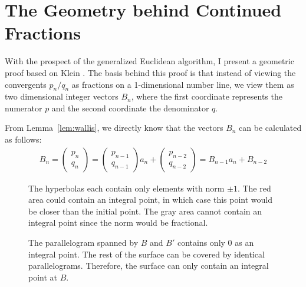\section{The Geometry behind Continued Fractions}

With the prospect of the generalized Euclidean algorithm, I present a geometric
proof based on Klein \cite{Klein95}.
The basis behind this proof is that instead of viewing the convergents $p_n/q_n$ as
fractions on a 1-dimensional number line,
we view them as two dimensional integer vectors $B_n$, where the first coordinate
represents the numerator $p$ and the second coordinate the denominator $q$.

From Lemma~\ref{lem:wallis},
we directly know that the vectors $B_n$ can be calculated as follows:
\begin{align*}
  B_n =
  \begin{pmatrix}
    p_n \\ q_n
  \end{pmatrix}
  =
  \begin{pmatrix}
    p_{n-1} \\ q_{n-1}
  \end{pmatrix}
  a_n
  +
  \begin{pmatrix}
    p_{n-2} \\ q_{n-2}
  \end{pmatrix}
  = B_{n-1} a_n + B_{n-2}
\end{align*}

\begin{figure}[tb]
  \centering
  
  \caption{
    The hyperbolas each contain only elements with norm $±1$.
    The red area could contain an integral point, in which case this point
    would be closer than the initial point.
    The gray area cannot contain an integral point since the norm would be
    fractional.
  }
\end{figure}

\begin{figure}[tb]
  \centering
  
  \caption{
    The parallelogram spanned by $B$ and $B'$ contains only $0$ as an integral point.
    The rest of the surface can be covered by identical parallelograms.
    Therefore, the surface can only contain an integral point at $B$.
  }
\end{figure}

